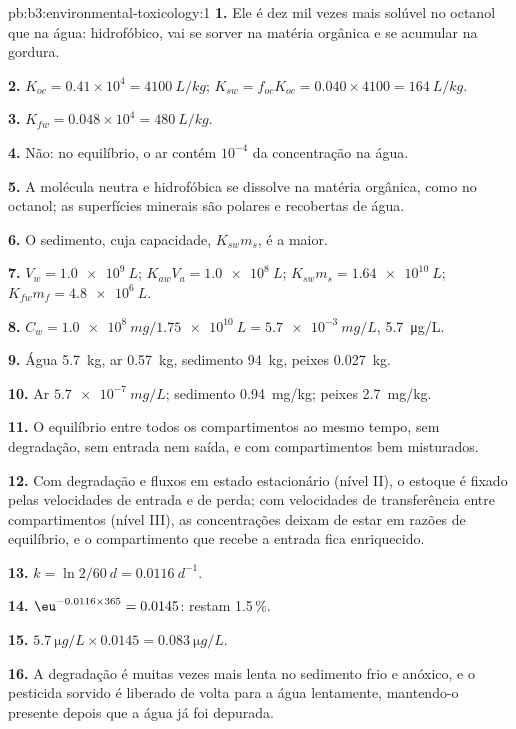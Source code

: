 \begin{solution}{pb:b3:environmental-toxicology:1}
\textbf{1.} Ele é dez mil vezes mais solúvel no octanol que na água: hidrofóbico,
vai se sorver na matéria orgânica e se acumular na gordura.

\textbf{2.} $K_{oc} = 0.41 \times 10^4 = \qty{4100}{L/kg}$; $K_{sw} = f_{oc}K_{oc} = 0.040 \times 4100 = \qty{164}{L/kg}$.

\textbf{3.} $K_{fw} = 0.048 \times 10^4 = \qty{480}{L/kg}$.

\textbf{4.} Não: no equilíbrio, o ar contém $10^{-4}$ da concentração na água.

\textbf{5.} A molécula neutra e hidrofóbica se dissolve na matéria orgânica, como no
octanol; as superfícies minerais são polares e recobertas de água.

\textbf{6.} O sedimento, cuja capacidade, $K_{sw}m_s$, é a maior.

\textbf{7.} $V_w = \qty{1.0e9}{L}$; $K_{aw}V_a = \qty{1.0e8}{L}$; $K_{sw}m_s = \qty{1.64e10}{L}$; $K_{fw}m_f = \qty{4.8e6}{L}$.

\textbf{8.} $C_w = \qty{1.0e8}{mg}/\qty{1.75e10}{L} = \qty{5.7e-3}{mg/L}$, \qty{5.7}{\micro g/L}.

\textbf{9.} Água \qty{5.7}{kg}, ar \qty{0.57}{kg}, sedimento \qty{94}{kg}, peixes \qty{0.027}{kg}.

\textbf{10.} Ar $\qty{5.7e-7}{mg/L}$; sedimento \qty{0.94}{mg/kg}; peixes \qty{2.7}{mg/kg}.

\textbf{11.} O equilíbrio entre todos os compartimentos ao mesmo tempo, sem degradação, sem
entrada nem saída, e com compartimentos bem misturados.

\textbf{12.} Com degradação e fluxos em estado estacionário (nível II), o estoque é fixado pelas
velocidades de entrada e de perda; com velocidades de transferência entre compartimentos (nível III),
as concentrações deixam de estar em razões de equilíbrio, e o compartimento que
recebe a entrada fica enriquecido.

\textbf{13.} $k = \ln 2/\qty{60}{d} = \qty{0.0116}{d^{-1}}$.

\textbf{14.} $\eu^{-0.0116 \times 365} = 0.0145$: restam 1.5\,\%.

\textbf{15.} $\qty{5.7}{\micro g/L} \times 0.0145 = \qty{0.083}{\micro g/L}$.

\textbf{16.} A degradação é muitas vezes mais lenta no sedimento frio e anóxico, e o pesticida
sorvido é liberado de volta para a água lentamente, mantendo-o presente depois que a
água já foi depurada.


\end{solution}
